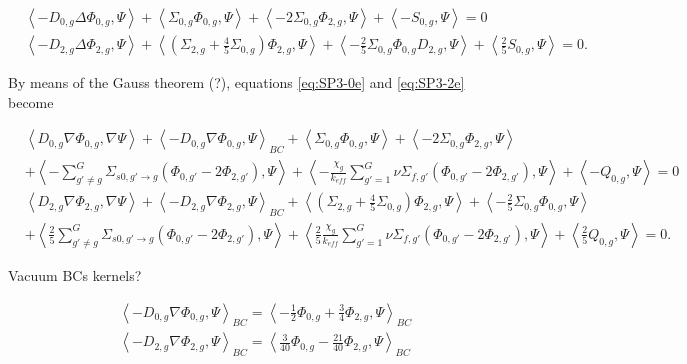 \documentclass[letterpaper]{article}
\begin{document}
\begin{align}
    & \left< - D_{0,g} \Delta \Phi_{0,g}, \Psi \right> + \left< \Sigma_{0,g} \Phi_{0,g}, \Psi \right> + \left< - 2 \Sigma_{0,g} \Phi_{2,g}, \Psi \right> + \left< - S_{0,g}, \Psi \right> = 0 \label{eq:SP3-0e} \\
    & \left< - D_{2,g} \Delta \Phi_{2,g}, \Psi \right> + \left< \left( \Sigma_{2,g} + \frac{4}{5} \Sigma_{0,g} \right) \Phi_{2,g}, \Psi \right> + \left< - \frac{2}{5} \Sigma_{0,g} \Phi_{0,g} D_{2,g}, \Psi \right> + \left< \frac{2}{5} S_{0,g}, \Psi \right> = 0. \label{eq:SP3-2e}
\end{align}

By means of the Gauss theorem (?), equations \ref{eq:SP3-0e} and \ref{eq:SP3-2e} become

\begin{align}
    & \left< D_{0,g} \nabla \Phi_{0,g}, \nabla \Psi \right> + \left< - D_{0,g} \nabla \Phi_{0,g}, \Psi \right>_{BC} + \left< \Sigma_{0,g} \Phi_{0,g}, \Psi \right> + \left< - 2 \Sigma_{0,g} \Phi_{2,g}, \Psi \right> \\ &+ \left< - \sum_{g'\ne g}^G \Sigma_{s0,g' \rightarrow g} \left( \Phi_{0,g'} - 2 \Phi_{2,g'} \right), \Psi \right> + \left< - \frac{\chi_g}{k_{eff}} \sum_{g'=1}^G \nu\Sigma_{f,g'} \left( \Phi_{0,g'} - 2 \Phi_{2,g'} \right), \Psi \right> + \left< - Q_{0,g}, \Psi \right> = 0 \label{eq:SP3-0e} \\
    & \left< D_{2,g} \nabla \Phi_{2,g}, \nabla \Psi \right> + \left< - D_{2,g} \nabla \Phi_{2,g}, \Psi \right>_{BC} + \left< \left( \Sigma_{2,g} + \frac{4}{5} \Sigma_{0,g} \right) \Phi_{2,g}, \Psi \right> + \left< - \frac{2}{5} \Sigma_{0,g} \Phi_{0,g}, \Psi \right> \\ &+ \left< \frac{2}{5} \sum_{g'\ne g}^G \Sigma_{s0,g' \rightarrow g} \left( \Phi_{0,g'} - 2 \Phi_{2,g'} \right), \Psi \right> + \left< \frac{2}{5} \frac{\chi_g}{k_{eff}} \sum_{g'=1}^G \nu\Sigma_{f,g'} \left( \Phi_{0,g'} - 2 \Phi_{2,g'} \right), \Psi \right> + \left< \frac{2}{5} Q_{0,g}, \Psi \right> = 0. \label{eq:SP3-2e}
\end{align}

Vacuum BCs kernels?

\begin{align}
    & \left< - D_{0,g} \nabla \Phi_{0,g}, \Psi \right>_{BC} = \left< -\frac{1}{2} \Phi_{0,g} + \frac{3}{4} \Phi_{2,g}, \Psi \right>_{BC} \\
    & \left< - D_{2,g} \nabla \Phi_{2,g}, \Psi \right>_{BC} = \left< \frac{3}{40} \Phi_{0,g} - \frac{21}{40} \Phi_{2,g}, \Psi \right>_{BC} \\
\end{align}
\end{document}
